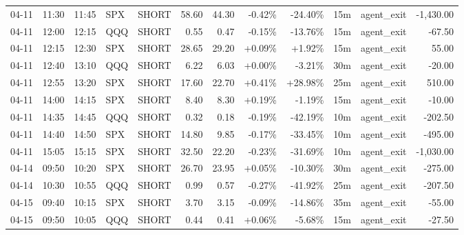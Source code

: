 \documentclass[11pt,a4paper]{article}
\begin{document}
\begin{center}
\begin{longtable}{>{\color{txtmain}}l l l l l r r r r r >{\color{txtmain}}l r}
04-11 & 11:30 & 11:45 & SPX & SHORT & 58.60 & 44.30 & \textcolor{lossred}{-0.42\%} & \textcolor{lossred}{-24.40\%} & 15m & agent\_exit & \textcolor{lossred}{-1,430.00} \\
04-11 & 12:00 & 12:15 & QQQ & SHORT & 0.55 & 0.47 & \textcolor{lossred}{-0.15\%} & \textcolor{lossred}{-13.76\%} & 15m & agent\_exit & \textcolor{lossred}{-67.50} \\
04-11 & 12:15 & 12:30 & SPX & SHORT & 28.65 & 29.20 & \textcolor{wingreen}{+0.09\%} & \textcolor{wingreen}{+1.92\%} & 15m & agent\_exit & \textcolor{wingreen}{55.00} \\
04-11 & 12:40 & 13:10 & QQQ & SHORT & 6.22 & 6.03 & \textcolor{wingreen}{+0.00\%} & \textcolor{lossred}{-3.21\%} & 30m & agent\_exit & \textcolor{lossred}{-20.00} \\
04-11 & 12:55 & 13:20 & SPX & SHORT & 17.60 & 22.70 & \textcolor{wingreen}{+0.41\%} & \textcolor{wingreen}{+28.98\%} & 25m & agent\_exit & \textcolor{wingreen}{510.00} \\
04-11 & 14:00 & 14:15 & SPX & SHORT & 8.40 & 8.30 & \textcolor{wingreen}{+0.19\%} & \textcolor{lossred}{-1.19\%} & 15m & agent\_exit & \textcolor{lossred}{-10.00} \\
04-11 & 14:35 & 14:45 & QQQ & SHORT & 0.32 & 0.18 & \textcolor{lossred}{-0.19\%} & \textcolor{lossred}{-42.19\%} & 10m & agent\_exit & \textcolor{lossred}{-202.50} \\
04-11 & 14:40 & 14:50 & SPX & SHORT & 14.80 & 9.85 & \textcolor{lossred}{-0.17\%} & \textcolor{lossred}{-33.45\%} & 10m & agent\_exit & \textcolor{lossred}{-495.00} \\
04-11 & 15:05 & 15:15 & SPX & SHORT & 32.50 & 22.20 & \textcolor{lossred}{-0.23\%} & \textcolor{lossred}{-31.69\%} & 10m & agent\_exit & \textcolor{lossred}{-1,030.00} \\
04-14 & 09:50 & 10:20 & SPX & SHORT & 26.70 & 23.95 & \textcolor{wingreen}{+0.05\%} & \textcolor{lossred}{-10.30\%} & 30m & agent\_exit & \textcolor{lossred}{-275.00} \\
04-14 & 10:30 & 10:55 & QQQ & SHORT & 0.99 & 0.57 & \textcolor{lossred}{-0.27\%} & \textcolor{lossred}{-41.92\%} & 25m & agent\_exit & \textcolor{lossred}{-207.50} \\
04-15 & 09:40 & 10:15 & SPX & SHORT & 3.70 & 3.15 & \textcolor{lossred}{-0.09\%} & \textcolor{lossred}{-14.86\%} & 35m & agent\_exit & \textcolor{lossred}{-55.00} \\
04-15 & 09:50 & 10:05 & QQQ & SHORT & 0.44 & 0.41 & \textcolor{wingreen}{+0.06\%} & \textcolor{lossred}{-5.68\%} & 15m & agent\_exit & \textcolor{lossred}{-27.50} \\

\end{longtable}
\end{center}
\end{document}
